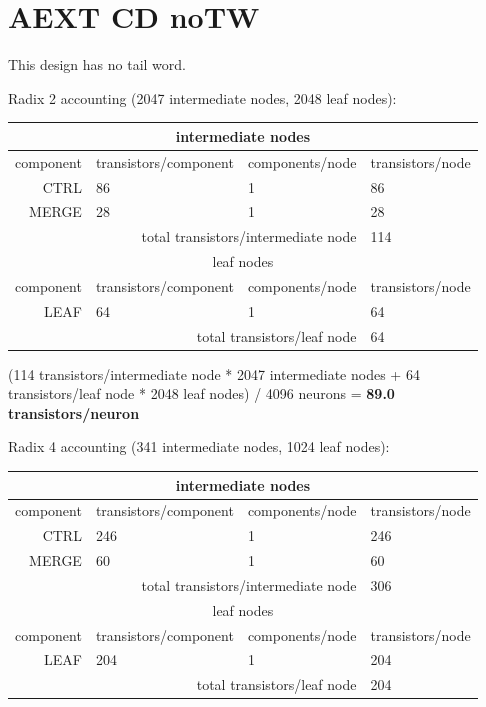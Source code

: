 \documentclass{article}
\begin{document}
\section{AEXT CD noTW \label{sec:AEXT_CD_noTW}}

This design has no tail word.

\noindent
Radix 2 accounting (2047 intermediate nodes, 2048 leaf nodes):

\begin{center}
    \begin{tabular}{|r|l|l|l|}
    \hline \multicolumn{4}{|c|}{intermediate nodes} \\ \hline
    component & transistors/component & components/node & transistors/node \\ \hline
    CTRL & 86 & 1 & 86 \\ \hline
    MERGE & 28 & 1 & 28 \\ \hline
    \hline \multicolumn{3}{|r|}{total transistors/intermediate node} & 114 \\ \hline
    \hline \multicolumn{4}{|c|}{leaf nodes} \\ \hline
    component & transistors/component & components/node & transistors/node \\ \hline
    LEAF & 64 & 1 & 64 \\ \hline
    \hline \multicolumn{3}{|r|}{total transistors/leaf node} & 64 \\ \hline
    \end{tabular}
\end{center}

(114 transistors/intermediate node * 2047 intermediate nodes + 64 transistors/leaf node * 2048 leaf nodes) / 4096 neurons = \textbf{89.0 transistors/neuron}

\noindent
Radix 4 accounting (341 intermediate nodes, 1024 leaf nodes):

\begin{center}
    \begin{tabular}{|r|l|l|l|}
    \hline \multicolumn{4}{|c|}{intermediate nodes} \\ \hline
    component & transistors/component & components/node & transistors/node \\ \hline
    CTRL & 246 & 1 & 246 \\ \hline
    MERGE & 60 & 1 & 60 \\ \hline
    \hline \multicolumn{3}{|r|}{total transistors/intermediate node} & 306 \\ \hline
    \hline \multicolumn{4}{|c|}{leaf nodes} \\ \hline
    component & transistors/component & components/node & transistors/node \\ \hline
    LEAF & 204 & 1 & 204 \\ \hline
    \hline \multicolumn{3}{|r|}{total transistors/leaf node} & 204 \\ \hline
    \end{tabular}
\end{center}
\end{document}
